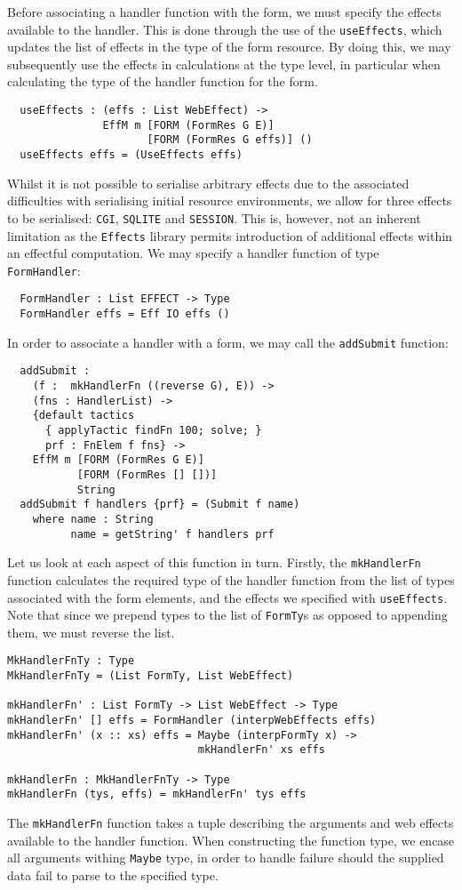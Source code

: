 Before associating a handler function with the form, we must specify the effects available to the handler. This is done through the use of the \texttt{useEffects}, which updates the list of effects in the type of the form resource. By doing this, we may subsequently use the effects in calculations at the type level, in particular when calculating the type of the handler function for the form. 
\begin{Verbatim}
  useEffects : (effs : List WebEffect) ->
               EffM m [FORM (FormRes G E)] 
                      [FORM (FormRes G effs)] ()
  useEffects effs = (UseEffects effs)
\end{Verbatim}
Whilst it is not possible to serialise arbitrary effects due to the associated difficulties with serialising initial resource environments, we allow for three effects to be serialised: \texttt{CGI}, \texttt{SQLITE} and \texttt{SESSION}. This is, however, not an inherent limitation as the \texttt{Effects} library permits introduction of additional effects within an effectful computation.
%
We may specify a handler function of type \texttt{FormHandler}:
\begin{Verbatim}
  FormHandler : List EFFECT -> Type
  FormHandler effs = Eff IO effs ()
\end{Verbatim}
In order to associate a handler with a form, we may call the \texttt{addSubmit} function:
\begin{Verbatim}
  addSubmit : 
    (f :  mkHandlerFn ((reverse G), E)) ->
    (fns : HandlerList) ->
    {default tactics 
      { applyTactic findFn 100; solve; }
      prf : FnElem f fns} ->
    EffM m [FORM (FormRes G E)]
           [FORM (FormRes [] [])] 
           String
  addSubmit f handlers {prf} = (Submit f name)
    where name : String
          name = getString' f handlers prf          
\end{Verbatim}

Let us look at each aspect of this function in turn. Firstly, the \texttt{mkHandlerFn} function calculates the required type of the handler function from the list of types associated with the form elements, and the effects we specified with \texttt{useEffects}. Note that since we prepend types to the list of \texttt{FormTy}s as opposed to appending them, we must reverse the list.
\begin{Verbatim}
MkHandlerFnTy : Type
MkHandlerFnTy = (List FormTy, List WebEffect)

mkHandlerFn' : List FormTy -> List WebEffect -> Type
mkHandlerFn' [] effs = FormHandler (interpWebEffects effs) 
mkHandlerFn' (x :: xs) effs = Maybe (interpFormTy x) -> 
                              mkHandlerFn' xs effs 

mkHandlerFn : MkHandlerFnTy -> Type 
mkHandlerFn (tys, effs) = mkHandlerFn' tys effs 
\end{Verbatim}
The \texttt{mkHandlerFn} function takes a tuple describing the arguments and web effects available to the handler function. When constructing the function type, we encase all arguments withing \texttt{Maybe} type, in order to handle failure should the supplied data fail to parse to the specified type.

